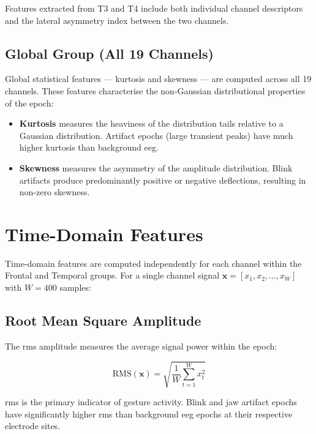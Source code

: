 Features extracted from T3 and T4 include both individual
channel descriptors and the lateral asymmetry index between
the two channels.

\subsection{Global Group (All 19 Channels)}

Global statistical features — kurtosis and skewness — are
computed across all 19 channels. These features characterise
the non-Gaussian distributional properties of the epoch:

\begin{itemize}[leftmargin=*]
    \item \textbf{Kurtosis} measures the heaviness of the
    distribution tails relative to a Gaussian distribution.
    Artifact epochs (large transient peaks) have much higher
    kurtosis than background \acrshort{eeg}.
    \item \textbf{Skewness} measures the asymmetry of the
    amplitude distribution. Blink artifacts produce
    predominantly positive or negative deflections, resulting
    in non-zero skewness.
\end{itemize}

\section{Time-Domain Features}
\label{sec:fe_time}

Time-domain features are computed independently for each
channel within the Frontal and Temporal groups. For a single
channel signal $\mathbf{x} = [x_1, x_2, \ldots, x_W]$ with
$W = 400$ samples:

\subsection{Root Mean Square Amplitude}

The \acrfull{rms} amplitude measures the average signal power
within the epoch:

\begin{equation}
\text{RMS}(\mathbf{x}) = \sqrt{\frac{1}{W}
\sum_{t=1}^{W} x_t^2}
\label{eq:rms}
\end{equation}

\acrshort{rms} is the primary indicator of gesture activity.
Blink and jaw artifact epochs have significantly higher
\acrshort{rms} than background \acrshort{eeg} epochs at
their respective electrode sites.

